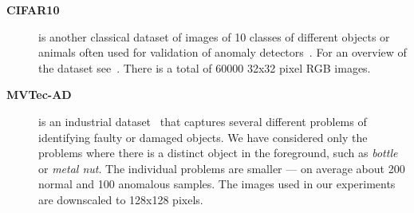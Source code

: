 \begin{description}
    \item[\textbf{CIFAR10}] is another classical dataset of images of 10 classes of different objects or animals often used for validation of anomaly detectors~\cite{ruff2018deep, ruff2019deep, chalapathy2018anomaly}. For an overview of the dataset see~\cite{krizhevsky2009learning}. There is a total of 60000 32x32 pixel RGB images.

    \item[\textbf{MVTec-AD}] is an industrial dataset~\cite{bergmann2019mvtec} that captures several different problems of identifying faulty or damaged objects. We have considered only the problems where there is a distinct object in the foreground, such as \textit{bottle} or \textit{metal nut}. The individual problems are smaller --- on average about 200 normal and 100 anomalous samples. The images used in our experiments are downscaled to 128x128 pixels.
    
\end{description}
